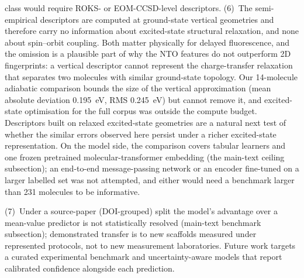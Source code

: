 \documentclass[final,3p,times,twocolumn]{elsarticle}
\begin{document}
class would require ROKS- or EOM-CCSD-level descriptors.\cite{Salvi2025}
(6)~The semi-empirical descriptors are computed at ground-state vertical geometries and
therefore carry no information about excited-state structural relaxation, and none about
spin--orbit coupling. Both matter physically for delayed fluorescence, and the omission is
a plausible part of why the NTO features do not outperform 2D fingerprints: a vertical
descriptor cannot represent the charge-transfer relaxation that separates two molecules with
similar ground-state topology. Our \num{14}-molecule adiabatic comparison bounds the size of
the vertical approximation (mean absolute deviation \qty{0.195}{\electronvolt}, RMS
\qty{0.245}{\electronvolt}) but cannot remove it, and excited-state optimisation for the
full corpus was outside the compute budget. Descriptors built on relaxed excited-state
geometries are a natural next test of whether the similar errors observed here
persist under a richer excited-state representation.
On the model side, the comparison covers tabular learners and one frozen pretrained
molecular-transformer embedding (the main-text ceiling subsection); an end-to-end message-passing
network or an encoder fine-tuned on a larger labelled set was not attempted, and either
would need a benchmark larger than \num{231} molecules to be informative.

(7)~Under a source-paper (DOI-grouped) split the model's advantage over a
mean-value predictor is not statistically resolved (main-text benchmark subsection);
demonstrated transfer is to new scaffolds measured under represented protocols,
not to new measurement laboratories.
Future work targets a curated experimental benchmark and uncertainty-aware models
that report calibrated confidence alongside each prediction.
\end{document}
